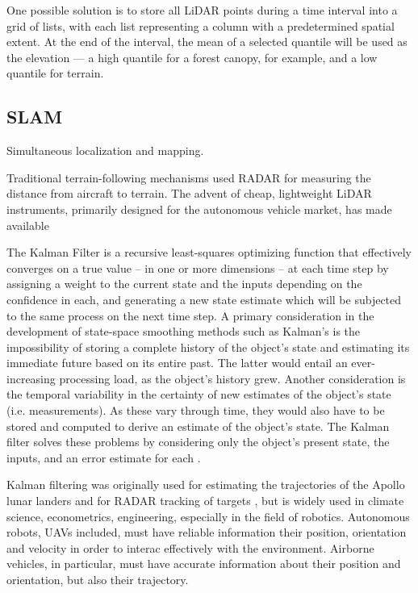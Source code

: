 \documentclass[10pt]{report}
\begin{document}
One possible solution is to store all LiDAR points during a time interval into a grid of lists, with each list representing a column with a predetermined spatial extent. At the end of the interval, the mean of a selected quantile will be used as the elevation --- a high quantile for a forest canopy, for example, and a low quantile for terrain.


\iffalse


\subsection{SLAM}

Simultaneous localization and mapping.

Traditional terrain-following mechanisms used RADAR for measuring the distance from aircraft to terrain. The advent of cheap, lightweight LiDAR instruments, primarily designed for the autonomous vehicle market, has made available 


The Kalman Filter \cite{Kalman1960} is a recursive least-squares optimizing function that effectively converges on a true value -- in one or more dimensions -- at each time step by assigning a weight to the current state and the inputs depending on the confidence in each, and generating a new state estimate which will be subjected to the same process on the next time step. A primary consideration in the development of state-space smoothing methods such as Kalman's is the impossibility of storing a complete history of the object's state and estimating its immediate future based on its entire past. The latter would entail an ever-increasing processing load, as the object's history grew. Another consideration is the temporal variability in the certainty of new estimates of the object's state (i.e. measurements). As these vary through time, they would also have to be stored and computed to derive an estimate of the object's state. The Kalman filter solves these problems by considering only the object's present state, the inputs, and an error estimate for each \cite{Swerling1959}. 

Kalman filtering was originally used for estimating the trajectories of the Apollo lunar landers and for RADAR tracking of targets \cite{Grewal2010}, but is widely used in climate science, econometrics, engineering, especially in the field of robotics. Autonomous robots, UAVs included, must have reliable information their position, orientation and velocity in order to interac effectively with the environment. Airborne vehicles, in particular, must have accurate information about their position and orientation, but also their trajectory.
\end{document}
